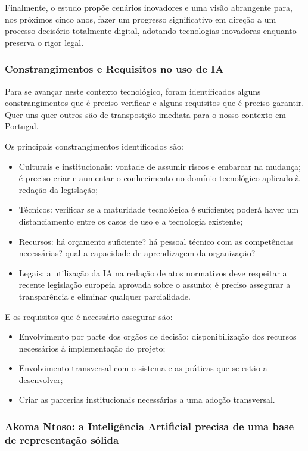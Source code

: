 Finalmente, o estudo propõe cenários inovadores e uma visão abrangente para, nos próximos cinco anos, 
fazer um progresso significativo em direção a um processo decisório totalmente digital, 
adotando tecnologias inovadoras enquanto preserva o rigor legal.

\subsubsection{Constrangimentos e Requisitos no uso de IA}

Para se avançar neste contexto tecnológico, foram identificados alguns constrangimentos 
que é preciso verificar e alguns requisitos que é preciso garantir. 
Quer uns quer outros são de transposição imediata para o nosso contexto em Portugal.

Os principais constrangimentos identificados são:

\begin{itemize}
    \item Culturais e institucionais: vontade de assumir riscos e embarcar na 
    mudança; é preciso criar e aumentar o conhecimento no domínio tecnológico 
    aplicado à redação da legislação;
    \item Técnicos: verificar se a maturidade tecnológica é suficiente; 
    poderá haver um distanciamento entre os casos de uso e a tecnologia existente;
    \item Recursos: há orçamento suficiente? há pessoal técnico com as 
    competências necessárias? qual a capacidade de aprendizagem da organização? 
    \item Legais: a utilização da IA na redação de atos normativos deve respeitar a
    recente legislação europeia aprovada sobre o assunto; é preciso assegurar 
    a transparência e eliminar qualquer parcialidade.
\end{itemize}

E os requisitos que é necessário assegurar são:
\begin{itemize}
    \item Envolvimento por parte dos orgãos de decisão: disponibilização dos 
    recursos necessários à implementação do projeto;
    \item Envolvimento transversal com o sistema e as práticas que se estão a desenvolver;
    \item Criar as parcerias institucionais necessárias a uma adoção transversal.
\end{itemize}


\subsubsection{Akoma Ntoso: a Inteligência Artificial precisa de uma base de representação sólida}

